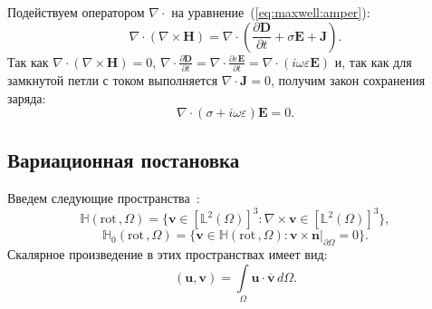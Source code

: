\documentclass[a4paper,12pt]{article}
\begin{document}
Подействуем оператором $\nabla \cdot$ на уравнение~(\ref{eq:maxwell:amper}):
\begin{equation*}
	\nabla \cdot ( \nabla \times \mathbf{H} ) = \nabla \cdot ( \frac{\partial \mathbf{D}}{\partial t} + \sigma \mathbf{E} + \mathbf{J} ) .
\end{equation*}
Так как $\nabla \cdot ( \nabla \times \mathbf{H} ) = 0$, $\nabla \cdot \frac{\partial \mathbf{D}}{\partial t} = \nabla \cdot \frac{\partial \varepsilon \mathbf{E}}{\partial t} = \nabla \cdot (i \omega \varepsilon \mathbf{E})$ и, так как для замкнутой петли с током выполняется $\nabla \cdot \mathbf{J} = 0$, получим закон сохранения заряда:
\begin{equation}
	\nabla \cdot ( \sigma + i \omega \varepsilon ) \mathbf{E} = 0 . \label{eq:charge}
\end{equation}


\subsection{Вариационная постановка}
Введем следующие пространства~\citep{balandin_vfem,monk}:
\begin{equation*}
	\mathbb{H} ( \mathrm{rot}\,, \Omega ) = \lbrace \mathbf{v} \in [\mathbb{L}^{2}(\Omega)]^{3} : \nabla \times \mathbf{v} \in [\mathbb{L}^{2}(\Omega)]^{3} \rbrace , \label{eq:H_rot}
\end{equation*}
\begin{equation*}
	\mathbb{H}_{0}( \mathrm{rot}\,, \Omega ) = \lbrace \mathbf{v} \in \mathbb{H}(\mathrm{rot}\,, \Omega) : \left. \mathbf{v} \times \mathbf{n} \right|_{\partial \Omega} = 0  \rbrace . \label{eq:H0_rot}
\end{equation*}
Скалярное произведение в этих пространствах имеет вид:
\begin{equation*}
	( \mathbf{u}, \mathbf{v} ) = \int\limits_{\Omega} \mathbf{u} \cdot \overline{\mathbf{v}} \,d\Omega .
\end{equation*}
\end{document}
